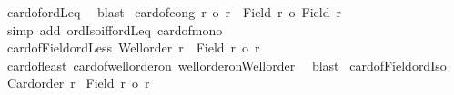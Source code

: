 \begin{isabellebody}
\ card{\isacharunderscore}{\kern0pt}of{\isacharunderscore}{\kern0pt}ordLeq\ \isamarkupfalse%
\ blast\isanewline
{}\isamarkupfalse%
%
\endisatagproof
{\isafoldproof}%
%
\isadelimproof
\isanewline
%
\endisadelimproof
\isanewline
{}\isamarkupfalse%
\ card{\isacharunderscore}{\kern0pt}of{\isacharunderscore}{\kern0pt}cong{\isacharcolon}{\kern0pt}\ {\isachardoublequoteopen}r\ {\isacharequal}{\kern0pt}o\ r{\isacharprime}{\kern0pt}\ {\isasymLongrightarrow}\ {\isacharbar}{\kern0pt}Field\ r{\isacharbar}{\kern0pt}\ {\isacharequal}{\kern0pt}o\ {\isacharbar}{\kern0pt}Field\ r{\isacharprime}{\kern0pt}{\isacharbar}{\kern0pt}{\isachardoublequoteclose}\isanewline
%
\isadelimproof
%
\endisadelimproof
%
\isatagproof
{}\isamarkupfalse%
\ {\isacharparenleft}{\kern0pt}simp\ add{\isacharcolon}{\kern0pt}\ ordIso{\isacharunderscore}{\kern0pt}iff{\isacharunderscore}{\kern0pt}ordLeq\ card{\isacharunderscore}{\kern0pt}of{\isacharunderscore}{\kern0pt}mono{}{\isacharparenright}{\kern0pt}%
\endisatagproof
{\isafoldproof}%
%
\isadelimproof
\isanewline
%
\endisadelimproof
\isanewline
{}\isamarkupfalse%
\ card{\isacharunderscore}{\kern0pt}of{\isacharunderscore}{\kern0pt}Field{\isacharunderscore}{\kern0pt}ordLess{\isacharcolon}{\kern0pt}\ {\isachardoublequoteopen}Well{\isacharunderscore}{\kern0pt}order\ r\ {\isasymLongrightarrow}\ {\isacharbar}{\kern0pt}Field\ r{\isacharbar}{\kern0pt}\ {\isasymle}o\ r{\isachardoublequoteclose}\isanewline
%
\isadelimproof
%
\endisadelimproof
%
\isatagproof
{}\isamarkupfalse%
\ card{\isacharunderscore}{\kern0pt}of{\isacharunderscore}{\kern0pt}least\ card{\isacharunderscore}{\kern0pt}of{\isacharunderscore}{\kern0pt}well{\isacharunderscore}{\kern0pt}order{\isacharunderscore}{\kern0pt}on\ well{\isacharunderscore}{\kern0pt}order{\isacharunderscore}{\kern0pt}on{\isacharunderscore}{\kern0pt}Well{\isacharunderscore}{\kern0pt}order\ \isamarkupfalse%
\ blast%
\endisatagproof
{\isafoldproof}%
%
\isadelimproof
\isanewline
%
\endisadelimproof
\isanewline
{}\isamarkupfalse%
\ card{\isacharunderscore}{\kern0pt}of{\isacharunderscore}{\kern0pt}Field{\isacharunderscore}{\kern0pt}ordIso{\isacharcolon}{\kern0pt}\isanewline
{}\ {\isachardoublequoteopen}Card{\isacharunderscore}{\kern0pt}order\ r{\isachardoublequoteclose}\isanewline
{}\ {\isachardoublequoteopen}{\isacharbar}{\kern0pt}Field\ r{\isacharbar}{\kern0pt}\ {\isacharequal}{\kern0pt}o\ r{\isachardoublequoteclose}\isanewline
%
\isadelimproof
%
\endisadelimproof

\end{isabellebody}
